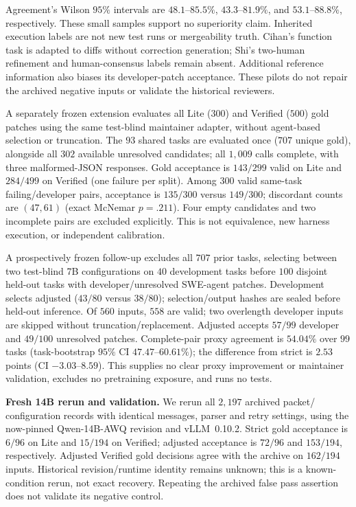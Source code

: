 \documentclass[10pt,conference]{IEEEtran}
\begin{document}
Agreement's Wilson $95\%$ intervals are $48.1$--$85.5\%$, $43.3$--$81.9\%$, and
$53.1$--$88.8\%$, respectively. These small samples support no superiority claim.
Inherited execution labels are not new test runs or mergeability truth. Cihan's function
task is adapted to diffs without correction generation; Shi's two-human refinement and
human-consensus labels remain absent. Additional reference information also biases its
developer-patch acceptance. These pilots do not repair the archived negative inputs or
validate the historical reviewers.

A separately frozen extension evaluates all Lite ($300$) and Verified ($500$) gold
patches using the same test-blind maintainer adapter, without agent-based selection
or truncation. The $93$ shared tasks are evaluated once ($707$ unique gold), alongside
all $302$ available unresolved candidates; all $1,009$ calls complete, with three
malformed-JSON responses. Gold acceptance is $143/299$ valid on Lite and $284/499$
on Verified (one failure per split). Among $300$ valid same-task failing/developer
pairs, acceptance is $135/300$ versus $149/300$; discordant counts are $(47,61)$
(exact McNemar $p=.211$). Four empty candidates and two incomplete pairs are excluded
explicitly. This is not equivalence, new harness execution, or independent calibration.


A prospectively frozen follow-up excludes all $707$ prior tasks, selecting between
two test-blind 7B configurations on $40$ development tasks before $100$ disjoint
held-out tasks with developer/unresolved SWE-agent patches. Development selects
adjusted ($43/80$ versus $38/80$); selection/output hashes are sealed before
held-out inference. Of $560$ inputs, $558$ are valid; two overlength developer
inputs are skipped without truncation/replacement. Adjusted accepts $57/99$
developer and $49/100$ unresolved patches. Complete-pair proxy agreement is
$54.04\%$ over $99$ tasks (task-bootstrap $95\%$ CI $47.47$--$60.61\%$);
the difference from strict is $2.53$ points (CI $-3.03$--$8.59$). This supplies
no clear proxy improvement or maintainer validation, excludes no pretraining
exposure, and runs no tests.

\textbf{Fresh 14B rerun and validation.} We rerun all $2,197$ archived packet/
configuration records with identical messages, parser and retry settings, using
the now-pinned Qwen-14B-AWQ revision and vLLM~0.10.2. Strict gold acceptance is
$6/96$ on Lite and $15/194$ on Verified;
adjusted acceptance is $72/96$ and $153/194$, respectively. Adjusted Verified gold decisions agree with the archive on
$162/194$ inputs. Historical revision/runtime identity
remains unknown; this is a known-condition rerun, not exact recovery. Repeating
the archived false pass assertion does not validate its negative control.
\end{document}
